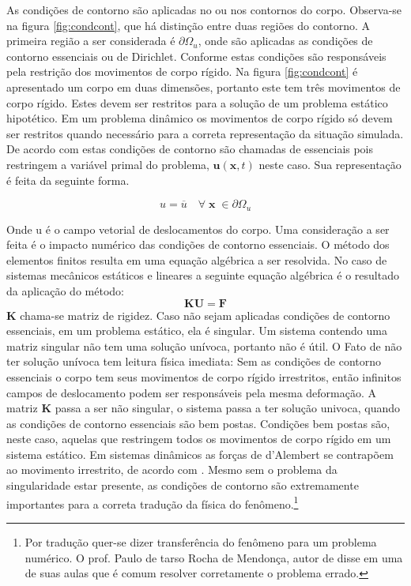 As condições de contorno são aplicadas no ou nos contornos do corpo. Observa-se na figura \ref{fig:condcont}, que há distinção entre duas regiões do contorno. A primeira região a ser considerada é $ \partial \Omega_u $, onde são aplicadas as condições de contorno essenciais ou de Dirichlet. Conforme \cite{Paulo} estas condições são responsáveis pela restrição dos movimentos de corpo rígido. Na figura \ref{fig:condcont} é apresentado um corpo em duas dimensões, portanto este tem três movimentos de corpo rígido. Estes devem ser restritos para a solução de um problema estático hipotético. Em um problema dinâmico os movimentos de corpo rígido só devem ser restritos quando necessário para a correta representação da situação simulada. De acordo com \cite{Paulo} estas condições de contorno são chamadas de essenciais pois restringem a variável primal do problema, $ \boldsymbol{u}(\boldsymbol{x},t) $ neste caso. Sua representação é feita da seguinte forma.

\begin{equation}
	u = \overline{u} \quad \forall \; \boldsymbol{x} \; \in  \partial \Omega_u
\end{equation}

Onde \gls{u} é o campo vetorial de deslocamentos do corpo. Uma consideração a ser feita é o impacto numérico das condições de contorno essenciais. O método dos elementos finitos resulta em uma equação algébrica a ser resolvida. No caso de sistemas mecânicos estáticos e lineares a seguinte equação algébrica é o resultado da aplicação do método:
\begin{equation}
    \boldsymbol{K} \boldsymbol{U} = \boldsymbol{F} 
\end{equation}
$ \boldsymbol{K} $ chama-se matriz de rigidez. Caso não sejam aplicadas condições de contorno essenciais, em um problema estático, ela é singular. Um sistema contendo uma matriz singular não tem uma solução unívoca, portanto não é útil. O Fato de não ter solução unívoca tem leitura física imediata: Sem as condições de contorno essenciais o corpo tem seus movimentos de corpo rígido irrestritos, então infinitos campos de deslocamento podem ser responsáveis pela mesma deformação. A matriz $\boldsymbol{K} $ passa a ser não singular, o sistema passa a ter solução univoca, quando as condições de contorno essenciais são bem postas. Condições bem postas são, neste caso, aquelas que restringem todos os movimentos de corpo rígido em um sistema estático. Em sistemas dinâmicos as forças de d'Alembert se contrapõem ao movimento irrestrito, de acordo com \cite{Paulo}. Mesmo sem o problema da singularidade estar presente, as condições de contorno são extremamente importantes para a correta tradução da física do fenômeno.\footnote{Por tradução quer-se dizer transferência do fenômeno para um problema numérico. O prof. Paulo de tarso Rocha de Mendonça, autor de \cite{Paulo} disse em uma de suas aulas que é comum resolver corretamente o problema errado. } \\

